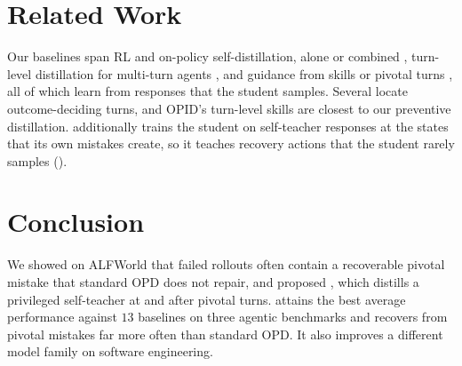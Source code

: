 \documentclass[10pt, logo, onecolumn, copyright]{nv}
\begin{document}
\section{Related Work}
\label{sec:related}
Our baselines span RL and on-policy self-distillation, alone or combined \citep{shao2024deepseekmath,zhao2026opsd,yang2026rlsd,lu2026sdar, he2026sdzero}, turn-level distillation for multi-turn agents \citep{zhou2026turnopd,wang2026tcod,zhong2026sod,zhang2026stepopsd,wang2026agentopsd}, and guidance from skills or pivotal turns \citep{wang2026skillsd,yang2026opid,yi2026pivotrl}, all of which learn from responses that the student samples. Several locate outcome-deciding turns, and OPID's turn-level skills are closest to our preventive distillation. \method{} additionally trains the student on self-teacher responses at the states that its own mistakes create, so it teaches recovery actions that the student rarely samples ().


\section{Conclusion}
\label{sec:conclusion}
We showed on ALFWorld that failed rollouts often contain a recoverable pivotal mistake that standard OPD does not repair, and proposed \method{}, which distills a privileged self-teacher at and after pivotal turns. \method{} attains the best average performance against $13$ baselines on three agentic benchmarks and recovers from pivotal mistakes far more often than standard OPD. It also improves a different model family on software engineering.


\newpage
\appendix
\onecolumn



\clearpage



\newpage

{
  \small
  
  
}
\end{document}
